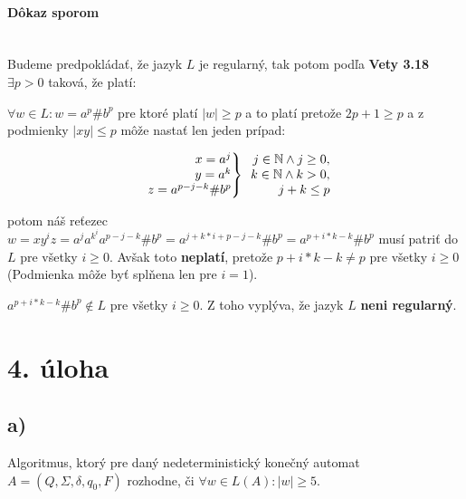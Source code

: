 \documentclass[11pt,a4paper]{article}
\begin{document}
\paragraph{Dôkaz sporom}\mbox{}\\

Budeme predpokládať, že jazyk $L$ je regularný, tak potom podľa \textbf{Vety 3.18} $\exists p > 0$ taková, že platí:

$\forall w \in L : w = a^p \# b^p$ pre ktoré platí $|w| \ge p$ a to platí pretože $2p + 1 \ge p$ a z podmienky $|xy| \le p$ môže nastať len jeden prípad:

\begin{align*}
    \left.
    \begin{array}{r@{}l}
        x = a^j \\
        y = a^k \\
        z = a^{p-j-k} \# b^p
    \end{array}
    \right\rbrace
    \begin{array}{r@{}l}
        j \in \mathbb{N} \land j \ge 0, \\
        k \in \mathbb{N} \land k > 0, \\
        j + k \le p
    \end{array}
\end{align*}

potom náš reťezec $w = x y^i z = a^j a^{k^i} a^{p-j-k} \# b^p = a^{j + k*i + p -j -k} \# b^p = a^{p + i*k - k} \# b^p$ musí patriť do $L$ pre všetky  $i \ge 0$.
Avšak toto \textbf{neplatí}, pretože $p + i*k -k \ne p$ pre všetky $i \ge 0$ (Podmienka môže byť splňena len pre $i = 1$).

$a^{p + i*k - k} \# b^p \notin L$ pre všetky $i \ge 0$. Z toho vyplýva, že jazyk $L$ \textbf{neni regularný}.





\newpage
\section{4. úloha}

\subsection{a)}

Algoritmus, ktorý pre daný nedeterministický konečný automat $A = (Q, \Sigma, \delta, q_0 , F)$ rozhodne, či \hspace{0.3cm} $\forall w \in L(A) : |w| \ge 5$.
\vspace{1cm}
\end{document}
